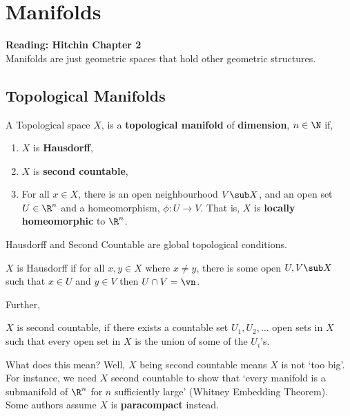 

\section{Manifolds}
\textbf{Reading: Hitchin Chapter 2}\\
\noindent
Manifolds are just geometric spaces that hold other geometric structures.

\subsection{Topological Manifolds}
\begin{ndefi}
  A Topological space $X$, is a \textbf{topological manifold} of \textbf{dimension}, $n \in \N$ if,
  \begin{enumerate}
    \item $X$ is \textbf{Hausdorff},
    \item $X$ is \textbf{second countable},
    \item For all $x \in X$, there is an open neighbourhood $V \sub X$, and an open set $U \in \R^n$ and a homeomorphism, $\phi : U \to V$. That is, $X$ is \textbf{locally homeomorphic} to $\R^n$.
  \end{enumerate}
\end{ndefi}

\noindent
Hausdorff and Second Countable are global topological conditions.
\begin{ndefi}[Hausdorff]
  $X$ is Hausdorff if for all $x, y \in X$ where $x \ne y$, there is some open $U, V \sub X$ such that $x \in U$ and $y \in V$ then $U \cap V = \vn$.
\end{ndefi}
 Further,
 \begin{ndefi}
   $X$ is second countable, if there exists a countable set $U_1, U_2, \dots$ open sets in $X$ such that every open set in $X$ is the union of some of the $U_i$'s.
 \end{ndefi}

 \noindent
 What does this mean? Well, $X$ being second countable means $X$ is not `too big'. For instance, we need $X$ second countable to show that `every manifold is a submanifold of $\R^n$ for $n$ sufficiently large' (Whitney Embedding Theorem). Some authors assume $X$ is \textbf{paracompact} instead.\\

